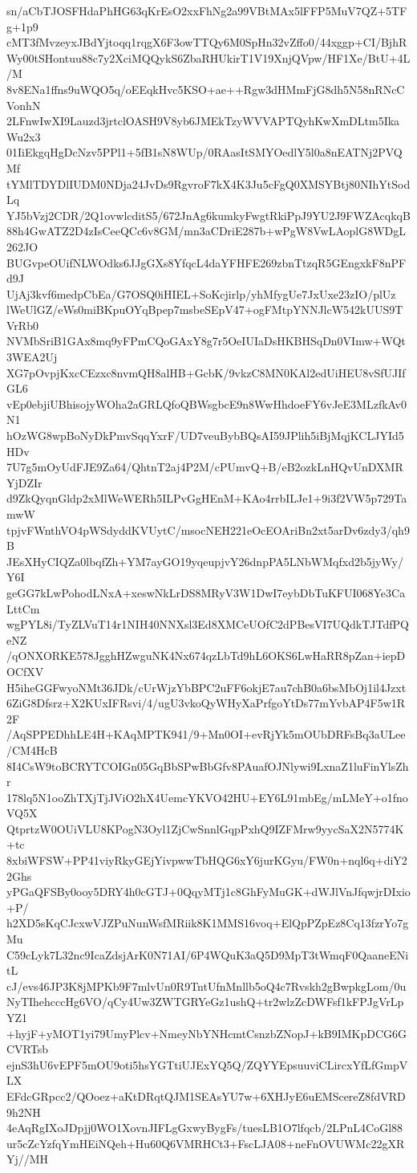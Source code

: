 sn/aCbTJOSFHdaPhHG63qKrEsO2xxFhNg2a99VBtMAx5lFFP5MuV7QZ+5TFg+1p9
cMT3fMvzeyxJBdYjtoqq1rqgX6F3owTTQy6M0SpHn32vZffo0/44xggp+CI/BjhR
Wy00tSHontuu88c7y2XciMQQykS6ZbaRHUkirT1V19XnjQVpw/HF1Xe/BtU+4L/M
8v8ENa1ffns9uWQO5q/oEEqkHvc5KSO+ae++Rgw3dHMmFjG8dh5N58nRNcCVonhN
2LFnwIwXI9Lauzd3jrtclOASH9V8yb6JMEkTzyWVVAPTQyhKwXmDLtm5IkaWu2x3
01IiEkgqHgDcNzv5PPl1+5fB1sN8WUp/0RAasItSMYOedlY5l0a8nEATNj2PVQMf
tYMlTDYDlIUDM0NDja24JvDs9RgvroF7kX4K3Ju5cFgQ0XMSYBtj80NIhYtSodLq
YJ5bVzj2CDR/2Q1ovwlcditS5/672JnAg6kumkyFwgtRkiPpJ9YU2J9FWZAcqkqB
88h4GwATZ2D4zIsCeeQCc6v8GM/mn3aCDriE287b+wPgW8VwLAoplG8WDgL262JO
BUGvpeOUifNLWOdks6JJgGXs8YfqcL4daYFHFE269zbnTtzqR5GEngxkF8nPFd9J
UjAj3kvf6medpCbEa/G7OSQ0iHIEL+SoKcjirlp/yhMfygUe7JxUxe23zIO/plUz
lWeUlGZ/eWs0miBKpuOYqBpep7msbeSEpV47+ogFMtpYNNJlcW542kUUS9TVrRb0
NVMbSriB1GAx8mq9yFPmCQoGAxY8g7r5OeIUIaDsHKBHSqDn0VImw+WQt3WEA2Uj
XG7pOvpjKxcCEzxc8nvmQH8alHB+GcbK/9vkzC8MN0KAl2edUiHEU8vSfUJIfGL6
vEp0ebjiUBhisojyWOha2aGRLQfoQBWsgbcE9n8WwHhdoeFY6vJeE3MLzfkAv0N1
hOzWG8wpBoNyDkPmvSqqYxrF/UD7veuBybBQsAI59JPlih5iBjMqjKCLJYId5HDv
7U7g5mOyUdFJE9Za64/QhtnT2aj4P2M/cPUmvQ+B/eB2ozkLnHQvUnDXMRYjDZIr
d9ZkQyqnGldp2xMlWeWERh5ILPvGgHEnM+KAo4rrbILJe1+9i3f2VW5p729TamwW
tpjvFWnthVO4pWSdyddKVUytC/msocNEH221eOcEOAriBn2xt5arDv6zdy3/qh9B
JEsXHyCIQZa0lbqfZh+YM7ayGO19yqeupjvY26dnpPA5LNbWMqfxd2b5jyWy/Y6I
geGG7kLwPohodLNxA+xeswNkLrDS8MRyV3W1DwI7eybDbTuKFUI068Ye3CaLttCm
wgPYL8i/TyZLVuT14r1NIH40NNXsl3Ed8XMCeUOfC2dPBesVI7UQdkTJTdfPQeNZ
/qONXORKE578JgghHZwguNK4Nx674qzLbTd9hL6OKS6LwHaRR8pZan+iepDOCfXV
H5iheGGFwyoNMt36JDk/cUrWjzYbBPC2uFF6okjE7au7chB0a6bsMbOj1il4Jzxt
6ZiG8Dfsrz+X2KUxIFRsvi/4/ugU3vkoQyWHyXaPrfgoYtDs77mYvbAP4F5w1R2F
/AqSPPEDhhLE4H+KAqMPTK941/9+Mn0OI+evRjYk5mOUbDRFsBq3aULee/CM4HcB
8I4CsW9toBCRYTCOIGn05GqBbSPwBbGfv8PAuafOJNlywi9LxnaZ1luFinYlsZhr
178lq5N1ooZhTXjTjJViO2hX4UemcYKVO42HU+EY6L91mbEg/mLMeY+o1fnoVQ5X
QtprtzW0OUiVLU8KPogN3Oyl1ZjCwSnnlGqpPxhQ9IZFMrw9yycSaX2N5774K+tc
8xbiWFSW+PP41viyRkyGEjYivpwwTbHQG6xY6jurKGyu/FW0n+nql6q+diY22Ghs
yPGaQFSBy0ooy5DRY4h0cGTJ+0QqyMTj1c8GhFyMuGK+dWJlVnJfqwjrDIxio+P/
h2XD5sKqCJcxwVJZPuNunWsfMRiik8K1MMS16voq+ElQpPZpEz8Cq13fzrYo7gMu
C59cLyk7L32nc9IcaZdsjArK0N71AI/6P4WQuK3aQ5D9MpT3tWmqF0QaaneENitL
cJ/evs46JP3K8jMPKb9F7mlvUn0R9TntUfnMnllb5oQ4c7Rvskh2gBwpkgLom/0u
NyTIhehcccHg6VO/qCy4Uw3ZWTGRYeGz1ushQ+tr2wlzZcDWFsf1kFPJgVrLpYZ1
+hyjF+yMOT1yi79UmyPlcv+NmeyNbYNHcmtCsnzbZNopJ+kB9IMKpDCG6GCVRTsb
ejnS3hU6vEPF5mOU9oti5hsYGTtiUJExYQ5Q/ZQYYEpsuuviCLircxYfLfGmpVLX
EFdcGRpcc2/QOoez+aKtDRqtQJM1SEAsYU7w+6XHJyE6uEMScereZ8fdVRD9h2NH
4eAqRgIXoJDpjj0WO1XovnJIFLgGxwyBygFs/tuesLB1O7lfqcb/2LPnL4CoGl88
ur5cZcYzfqYmHEiNQeh+Hu60Q6VMRHCt3+FscLJA08+neFnOVUWMc22gXRYj//MH
